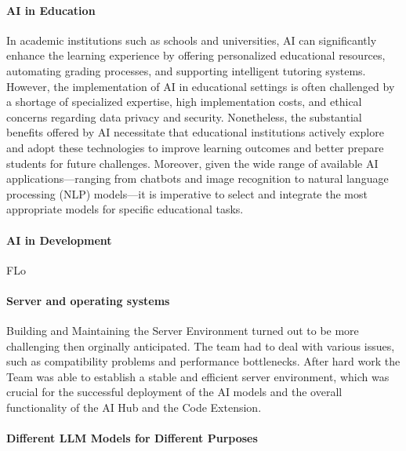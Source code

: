\paragraph{AI in Education}

In academic institutions such as schools and universities, AI can significantly enhance the learning experience by offering personalized educational resources, 
automating grading processes, and supporting intelligent tutoring systems. However, the implementation of AI in educational settings is often challenged by a shortage of 
specialized expertise, high implementation costs, and ethical concerns regarding data privacy and security. Nonetheless, 
the substantial benefits offered by AI necessitate that educational institutions actively explore and adopt these technologies 
to improve learning outcomes and better prepare students for future challenges. Moreover, given the wide range of available AI applications—ranging from chatbots and image 
recognition to natural language processing (NLP) models—it is imperative to select and integrate the most appropriate models for specific educational tasks.

\paragraph{AI in Development}
\label{par:AI-in-Development}

FLo



\paragraph{Server and operating systems}

Building and Maintaining the Server Environment turned out to be more challenging then orginally anticipated. The team had to deal with various issues, such as compatibility problems and performance bottlenecks.
After hard work the Team was able to establish a stable and efficient server environment, which was crucial for the successful deployment of the AI models and the overall functionality of the AI Hub and the Code Extension.

\paragraph{Different LLM Models for Different Purposes}

